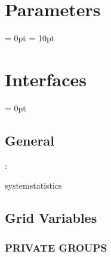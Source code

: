 \documentclass{article}
\begin{document}
\section{Parameters} 


\parskip = 0pt
\parskip = 10pt 

\section{Interfaces} 


\parskip = 0pt

\vspace{3mm} \subsection*{General}

: 

systemstatistics
\vspace{2mm}
\subsection*{Grid Variables}
\vspace{5mm}\subsubsection{PRIVATE GROUPS}

\vspace{5mm}
\end{document}
